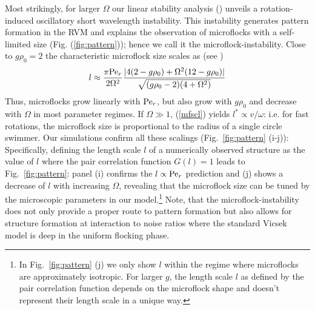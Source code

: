 \documentclass[aps,twocolumn,showlabels,showrefs,amsmath,amssymb,pre,superscriptaddress, floatfix, colors]{revtex4}
\newcommand{\1}{\begin{equation}}
\newcommand{\2}{\end{equation}}
\newcommand{\4}[2]{{\frac{#1}{#2}}}
\begin{document}
Most strikingly, for larger $\Omega$ our  
linear stability analysis (\cite{SM}) unveils a rotation-induced oscillatory short wavelength 
instability. 
This instability generates pattern formation in the RVM and explains the observation of microflocks with 
a self-limited size (Fig. (\ref{fig:pattern})); hence we call it the microflock-instability.
Close to $g\rho_0=2$ the characteristic microflock size scales as (see \cite{SM})
\1 
l \approx \4{\pi{\rm Pe}_r}{2\Omega^2} \4{|4(2-g\rho_0)+\Omega^2(12-g\rho_0)|}{\sqrt{(g\rho_0-2)(4+\Omega^2)}} \label{mfscl}
\2
Thus, microflocks grow linearly with ${\rm Pe}_r$, but also grow with $g\rho_0$ and decrease with $\Omega$ in most parameter
regimes. If $\Omega\gg 1$, (\ref{mfscl}) yields 
$l^\ast \propto v/\omega$: i.e. for fast rotations, 
the microflock size is proportional to the radius of a single circle swimmer.
Our simulations confirm all these scalings (Fig.~\ref{fig:pattern} (i-j)): 
Specifically, defining the length scale $l$ of a numerically observed structure 
as the value of $l$ where the pair correlation function $G(l)=1$ leads to 
Fig.~\ref{fig:pattern}: panel (i) confirms the $l \propto {\rm Pe}_r$ prediction and (j) shows a decrease of $l$ 
with increasing $\Omega$, revealing that the microflock size 
can be tuned by the microscopic parameters in our model.\footnote{In Fig.~\ref{fig:pattern} (j) 
we only show $l$ within the regime where microflocks are approximately isotropic. For larger $g$, the length scale $l$ as defined by the pair 
correlation function depends on the microflock shape and doesn't represent their length scale in a unique way.}
Note, that the microflock-instability does not only provide a proper route to pattern formation but also allows for 
structure formation at interaction to noise ratios where the standard Vicsek model is deep in the uniform flocking phase. 
\end{document}
